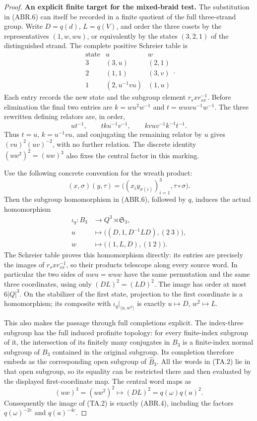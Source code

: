 \begin{proof}
\par\medskip\noindent\textbf{An explicit finite target for the mixed-braid test.}\quad
The substitution in (ABR.6) can itself be recorded in a finite quotient
of the full three-strand group.  Write
$D=q(d)$, $L=q(V)$, and order the three cosets by the representatives
$(1,w,wu)$, or equivalently by the states $(3,2,1)$ of the distinguished
strand.  The complete positive Schreier table is
\[
\begin{array}{c|cc}
\text{state}&u& w\\\hline
3&(3,u)&(2,1)\\
2&(1,1)&(3,v)\\
1&(2,u^{-1}vu)&(1,u)
\end{array}.
\]
Each entry records the new state and the subgroup element
$r_s x r_{s x}^{-1}$.  Before elimination the final two entries
are $k=w u^2w^{-1}$ and $t=wuwu^{-1}w^{-1}$.
The three rewritten defining relators are, in order,
\[
u t^{-1},\qquad t k u^{-1}v^{-1},\qquad
k v u v^{-1}k^{-1}t^{-1}.
\]
Thus $t=u$, $k=u^{-1}vu$, and conjugating the remaining relator
by $u$ gives $(vu)^2(uv)^{-2}$, with no further relation.
The discrete identity
$(u w^2)^2=(uw)^3$ also fixes the central factor in this marking.

Use the following concrete convention for the wreath product:
\[
 (x,\sigma)(y,\tau)
   =\bigl((x_i y_{\sigma(i)})_{i=1}^3,\tau\circ\sigma\bigr).
\]
Then the subgroup homomorphism in (ABR.6), followed by $q$, induces
the actual homomorphism
\[
\begin{aligned}
 \iota_q:B_3&\longrightarrow Q^3\rtimes\mathfrak S_3,\\
 u&\longmapsto \bigl((D,1,D^{-1}LD),(2\ 3)\bigr),\\
 w&\longmapsto \bigl((1,L,D),(1\ 2)\bigr).
\end{aligned}
\]
The Schreier table proves this homomorphism directly: its entries
are precisely the images of $r_s x r_{s x}^{-1}$, so their products
telescope along every source word.  In particular the two sides
of $uwu=wuw$ have the same permutation and the same three
coordinates, using only $(DL)^2=(LD)^2$.
The image has order at most $6|Q|^3$.  On the stabilizer of the
first state, projection to the first coordinate is a homomorphism;
its composite with $\iota_q|_{\langle u,w^2\rangle}$ is exactly
$u\mapsto D$, $w^2\mapsto L$.

This also makes the passage through full completions explicit.
The index-three subgroup has the full induced profinite topology:
for every finite-index subgroup of it, the intersection of its
finitely many conjugates in $B_3$ is a finite-index normal subgroup
of $B_3$ contained in the original subgroup.  Its completion
therefore embeds as the corresponding open subgroup of
$\widehat B_3$.  All the words in (TA.2) lie in that open subgroup,
so its equality can be restricted there and then evaluated by
the displayed first-coordinate map.  The central word maps as
\[
 (uw)^3=(u w^2)^2\longmapsto
 (DL)^2=q(\omega)q(a)^2.
\]
Consequently the image of (TA.2) is exactly (ABR.4), including
the factors $q(\omega)^{-2c}$ and $q(a)^{-4c}$.


\end{proof}
